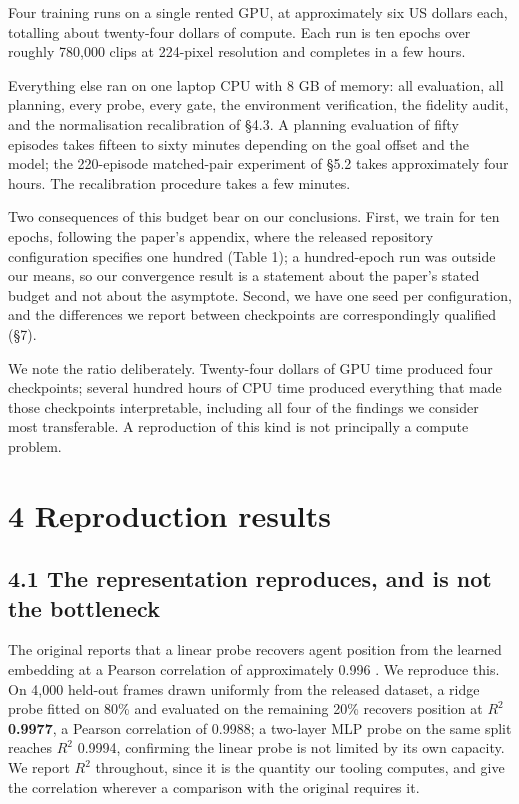 \documentclass[10pt]{article}
\begin{document}
Four training runs on a single rented GPU, at approximately six US dollars each,
totalling about twenty-four dollars of compute. Each run is ten epochs over
roughly 780,000 clips at 224-pixel resolution and completes in a few hours.

Everything else ran on one laptop CPU with 8 GB of memory: all evaluation, all
planning, every probe, every gate, the environment verification, the fidelity
audit, and the normalisation recalibration of \S{}4.3. A planning evaluation of
fifty episodes takes fifteen to sixty minutes depending on the goal offset and
the model; the 220-episode matched-pair experiment of \S{}5.2 takes approximately
four hours. The recalibration procedure takes a few minutes.

Two consequences of this budget bear on our conclusions. First, we train for ten
epochs, following the paper's appendix, where the released repository
configuration specifies one hundred (Table 1); a hundred-epoch run was outside
our means, so our convergence result is a statement about the paper's stated
budget and not about the asymptote. Second, we have one seed per configuration,
and the differences we report between checkpoints are correspondingly qualified
(\S{}7).

We note the ratio deliberately. Twenty-four dollars of GPU time produced four
checkpoints; several hundred hours of CPU time produced everything that made
those checkpoints interpretable, including all four of the findings we consider
most transferable. A reproduction of this kind is not principally a compute
problem.

\section{4 Reproduction results}\label{reproduction-results}

\subsection{4.1 The representation reproduces, and is not the bottleneck}\label{the-representation-reproduces-and-is-not-the-bottleneck}

The original reports that a linear probe recovers agent position from the
learned embedding at a Pearson correlation of approximately 0.996 \citep[Tab.~3, App.~F.2]{maes2026lewm}. We
reproduce this. On 4,000 held-out frames drawn uniformly from the released
dataset, a ridge probe fitted on 80\% and evaluated on the remaining 20\%
recovers position at \textbf{$R^{2}$ 0.9977}, a Pearson correlation of 0.9988; a two-layer
MLP probe on the same split reaches $R^{2}$ 0.9994, confirming the linear probe is
not limited by its own capacity. We report $R^{2}$ throughout, since it is the
quantity our tooling computes, and give the correlation wherever a comparison
with the original requires it.
\end{document}
